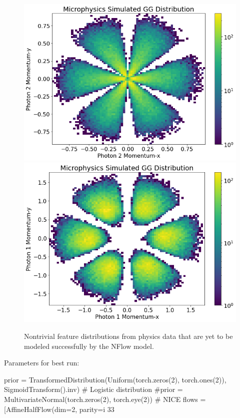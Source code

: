 \begin{figure}[!ht]
\begin{minipage}{0.4\textwidth}
        \centering
        \includegraphics[width=.9\textwidth,trim={0 0 0 .875cm},clip]{pictures/milestoneR2/pxpy/g2pxpy.png}
        \includegraphics[width=.9\textwidth,trim={0 0 0 .875cm},clip]{pictures/milestoneR2/pxpy/gpxpy.png}
    \end{minipage}
    \caption{Nontrivial feature distributions from physics data that are yet to be modeled successfully by the NFlow model.}
    \label{fig:extra}
\end{figure}

\iffalse
Parameters for best run:

prior = TransformedDistribution(Uniform(torch.zeros(2), torch.ones(2)), SigmoidTransform().inv) # Logistic distribution
#prior = MultivariateNormal(torch.zeros(2), torch.eye(2))
# NICE
flows = [AffineHalfFlow(dim=2, parity=i%
33

